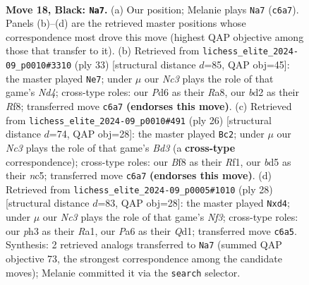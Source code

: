 \documentclass[11pt]{article}
\begin{document}
\clearpage

\begin{figure}[p]\centering
\begin{subfigure}{0.46\textwidth}\centering
\resizebox{\linewidth}{!}{%
\newchessgame
\chessboard[
  setfen={1r1q1b2/1bp1rppk/p1np4/1p1Bp2p/1P2P3/P2P1N1P/2PBRPP1/RQ3K2 b - - 0 18},
  showmover=false,
  pgfstyle=straightmove, color=movearrow, markmove={c6-a7}
]}
\caption{}
\end{subfigure}\hfill
\begin{subfigure}{0.46\textwidth}\centering
\resizebox{\linewidth}{!}{%
\newchessgame
\chessboard[
  setfen={r4rk1/pbq2pp1/1ppbp2p/3nN3/P2P4/1BPQ2B1/1P3PPP/R3R1K1 b - - 3 17},
  showmover=false,
  pgfstyle=straightmove, color=movearrow, markmove={d5-e7}
]}
\caption{}
\end{subfigure}
\\[4pt]
\begin{subfigure}{0.46\textwidth}\centering
\resizebox{\linewidth}{!}{%
\newchessgame
\chessboard[
  setfen={r1bq1rk1/4ppbp/2pp2p1/2n5/p1P1P3/2NB3P/PP1BQPP1/1R3RK1 w - - 2 14},
  showmover=false,
  pgfstyle=straightmove, color=movearrow, markmove={d3-c2}
]}
\caption{}
\end{subfigure}\hfill
\begin{subfigure}{0.46\textwidth}\centering
\resizebox{\linewidth}{!}{%
\newchessgame
\chessboard[
  setfen={r4rk1/pb1qppbp/1p2p1p1/2p1P3/2Pn1B2/3P1N2/PP2BPPP/R2QR1K1 w - - 8 15},
  showmover=false,
  pgfstyle=straightmove, color=movearrow, markmove={f3-d4}
]}
\caption{}
\end{subfigure}
\caption{\textbf{Move 18, Black: \texttt{Na7}.} (a) Our position; Melanie plays \texttt{Na7} (\texttt{c6a7}). Panels (b)--(d) are the retrieved master positions whose correspondence most drove this move (highest QAP objective among those that transfer to it). (b) Retrieved from \texttt{lichess\_elite\_2024-09\_p0010\#3310} (ply 33) [structural distance $d$=85, QAP obj=45]: the master played \texttt{Ne7}; under $\mu$ our \emph{Nc3} plays the role of that game's \emph{Nd4}; cross-type roles: our \emph{P}d6 as their \emph{R}a8, our \emph{b}d2 as their \emph{R}f8; transferred move \texttt{c6a7} \textbf{(endorses this move)}. (c) Retrieved from \texttt{lichess\_elite\_2024-09\_p0010\#491} (ply 26) [structural distance $d$=74, QAP obj=28]: the master played \texttt{Bc2}; under $\mu$ our \emph{Nc3} plays the role of that game's \emph{Bd3} (a \textbf{cross-type} correspondence); cross-type roles: our \emph{B}f8 as their \emph{R}f1, our \emph{b}d5 as their \emph{n}c5; transferred move \texttt{c6a7} \textbf{(endorses this move)}. (d) Retrieved from \texttt{lichess\_elite\_2024-09\_p0005\#1010} (ply 28) [structural distance $d$=83, QAP obj=28]: the master played \texttt{Nxd4}; under $\mu$ our \emph{Nc3} plays the role of that game's \emph{Nf3}; cross-type roles: our \emph{p}h3 as their \emph{R}a1, our \emph{P}a6 as their \emph{Q}d1; transferred move \texttt{c6a5}. Synthesis: 2 retrieved analogs transferred to \texttt{Na7} (summed QAP objective 73, the strongest correspondence among the candidate moves); Melanie committed it via the \texttt{search} selector.}
\label{fig:thought-m35}
\end{figure}
\end{document}
